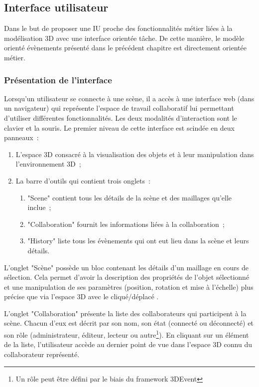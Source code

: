\subsection{Interface utilisateur}
Dans le but de proposer une \gls{IU} proche des fonctionnalités métier liées à la 
modélisation 3D avec une interface orientée tâche. De cette manière, le modèle 
orienté évènements présenté dans le précédent chapitre est directement orientée 
métier.
\subsubsection{Présentation de l'interface}

Lorsqu'un utilisateur se connecte à une scène, il a accès à une interface web 
(dans un navigateur) qui représente l'espace de travail collaboratif lui permettant 
d'utiliser différentes fonctionnalités. Les deux modalités d'interaction sont le clavier 
et la souris. Le premier niveau de cette 
interface est scindée en deux panneaux~: 
\begin{enumerate}
	\item L'espace 3D consacré à la visualisation des objets et à leur manipulation 
	dans l'environnement 3D~;
	\item La barre d'outils qui contient trois onglets~:~
	\begin{enumerate}
		\item "Scene" contient tous les détails de la scène et des maillages qu'elle 
		inclue~; 
		\item "Collaboration" fournit les informations liées à la collaboration~;
		\item "History" liste tous les évènements qui ont eut lieu dans la scène et 
		leurs  détails. 
	\end{enumerate}
\end{enumerate}

L'onglet "Scène" possède un bloc contenant les détails d'un maillage en cours de 
sélection. Cela permet d'avoir la description des propriétés de l'objet sélectionné et 
une manipulation de ses paramètres (position, rotation et mise à l'échelle) plus 
précise que via l'espace 3D avec le cliqué/déplacé .

L'onglet "Collaboration" présente la liste des collaborateurs qui participent à la 
scène. Chacun d'eux est décrit par son nom, son état  (connecté ou déconnecté) 
et son rôle (administrateur, éditeur, lecteur ou autre\footnote{Un rôle peut être 
	défini par le biais du \gls{framework} 3DEvent}). En cliquant sur un élément de 
	la 
liste, l'utilisateur accède au dernier point de vue dans l'espace 3D connu du 
collaborateur représenté.

